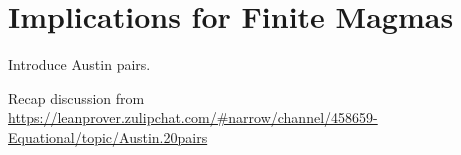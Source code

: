 \section{Implications for Finite Magmas}


Introduce Austin pairs.

Recap discussion from \url{https://leanprover.zulipchat.com/#narrow/channel/458659-Equational/topic/Austin.20pairs}

